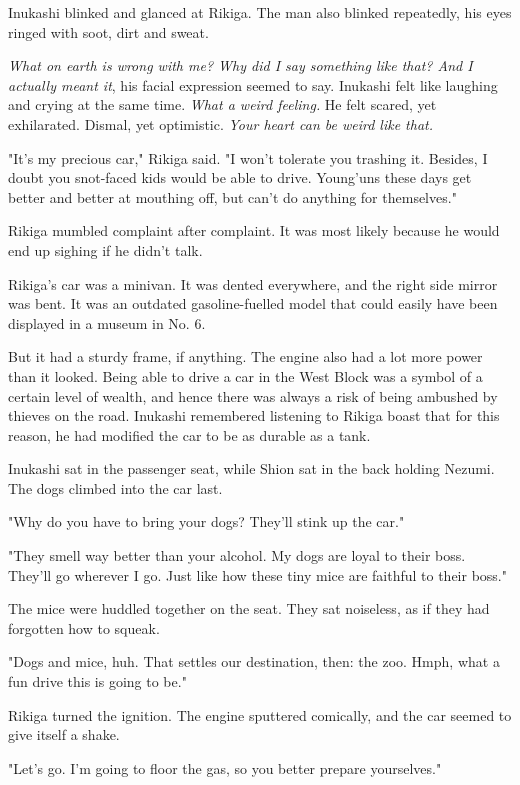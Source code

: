 Inukashi blinked and glanced at Rikiga. The man also blinked repeatedly,
his eyes ringed with soot, dirt and sweat.

\emph{What on earth is wrong with me? Why did I say something like that? And I
actually meant it}, his facial expression seemed to say. Inukashi felt
like laughing and crying at the same time. \emph{What a weird feeling.} He felt
scared, yet exhilarated. Dismal, yet optimistic. \emph{Your heart can be weird
like that.}

"It's my precious car," Rikiga said. "I won't tolerate you trashing it.
Besides, I doubt you snot-faced kids would be able to drive. Young'uns
these days get better and better at mouthing off, but can't do anything
for themselves."

Rikiga mumbled complaint after complaint. It was most likely because he
would end up sighing if he didn't talk.

Rikiga's car was a minivan. It was dented everywhere, and the right side
mirror was bent. It was an outdated gasoline-fuelled model that could
easily have been displayed in a museum in No. 6.

But it had a sturdy frame, if anything. The engine also had a lot more
power than it looked. Being able to drive a car in the West Block was a
symbol of a certain level of wealth, and hence there was always a risk
of being ambushed by thieves on the road. Inukashi remembered listening
to Rikiga boast that for this reason, he had modified the car to be as
durable as a tank.

Inukashi sat in the passenger seat, while Shion sat in the back holding
Nezumi. The dogs climbed into the car last.

"Why do you have to bring your dogs? They'll stink up the car."

"They smell way better than your alcohol. My dogs are loyal to their
boss. They'll go wherever I go. Just like how these tiny mice are
faithful to their boss."

The mice were huddled together on the seat. They sat noiseless, as if
they had forgotten how to squeak.

"Dogs and mice, huh. That settles our destination, then: the zoo. Hmph,
what a fun drive this is going to be."

Rikiga turned the ignition. The engine sputtered comically, and the car
seemed to give itself a shake.

"Let's go. I'm going to floor the gas, so you better prepare
yourselves."

